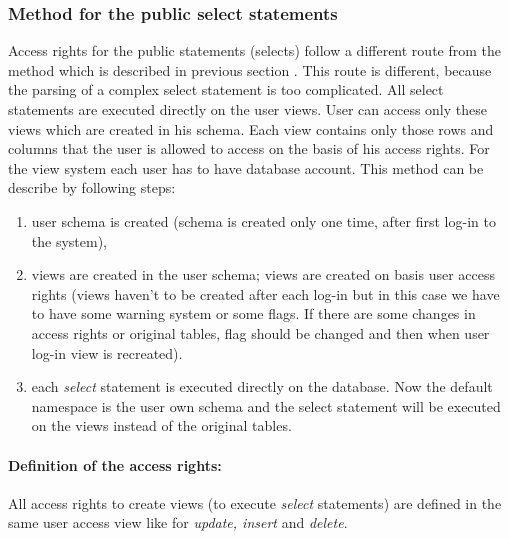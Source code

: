 \subsubsection{Method for the public select statements}

Access rights for the public statements (selects) follow a different route from the method
which is described in previous section \label{sec:pseudosql}. This route is different, because the parsing of a complex select statement is too complicated.
All select statements are executed directly on the user views. User can access only these views which are created in his schema. Each view contains only those rows and columns that the user is allowed to access on the basis of his access rights. For the view system each user has to have database account. This method can be describe by following steps:
\begin{enumerate}
\item user schema is created (schema is created only one time, after first log-in to the system),
\item views are created in the user schema; views are created on basis user access rights    
(views haven't to be created after each log-in but in this case we have to have some warning system or some flags. If there are some changes in access rights or original tables, flag should be changed
and then when user log-in view is recreated). 

\item each \emph{select} statement is executed directly on the database. Now the default namespace is the user own schema and the select statement will be executed on the views instead of the original tables.
\end{enumerate}


\paragraph{Definition of the access rights:}
All access rights to create views (to execute \emph{select} statements)
are defined in the same user access view like for \emph{update,
insert} and \emph{delete}.

